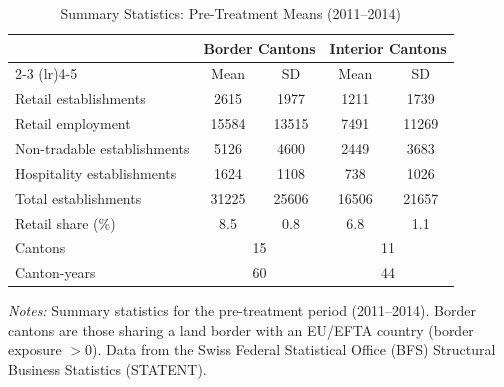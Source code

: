 \begin{table}[t]
\centering
\caption{Summary Statistics: Pre-Treatment Means (2011--2014)}
\label{tab:summary}
\begin{tabular}{lcccc}
\toprule
 & \multicolumn{2}{c}{Border Cantons} & \multicolumn{2}{c}{Interior Cantons} \\
\cmidrule(lr){2-3} \cmidrule(lr){4-5}
 & Mean & SD & Mean & SD \\
\midrule
Retail establishments & 2615 & 1977 & 1211 & 1739 \\
Retail employment & 15584 & 13515 & 7491 & 11269 \\
Non-tradable establishments & 5126 & 4600 & 2449 & 3683 \\
Hospitality establishments & 1624 & 1108 & 738 & 1026 \\
Total establishments & 31225 & 25606 & 16506 & 21657 \\
Retail share (\%) & 8.5 & 0.8 & 6.8 & 1.1 \\
\midrule
Cantons & \multicolumn{2}{c}{15} & \multicolumn{2}{c}{11} \\
Canton-years & \multicolumn{2}{c}{60} & \multicolumn{2}{c}{44} \\
\bottomrule
\end{tabular}
\begin{tablenotes}
\item \textit{Notes:} Summary statistics for the pre-treatment period (2011--2014). Border cantons are those sharing a land border with an EU/EFTA country (border exposure $> 0$). Data from the Swiss Federal Statistical Office (BFS) Structural Business Statistics (STATENT).
\end{tablenotes}
\end{table}
